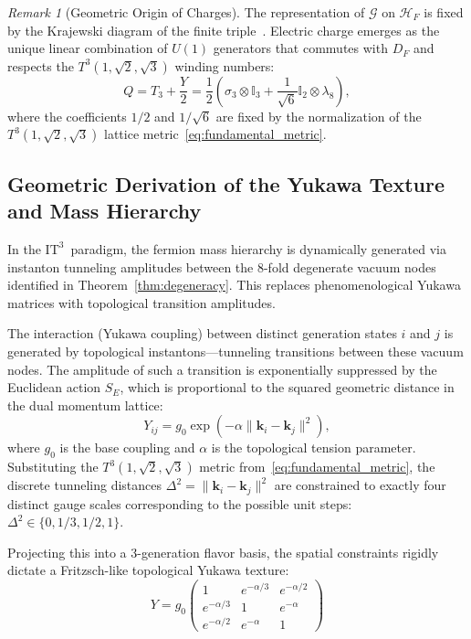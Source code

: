 \documentclass[onecolumn,aps,prd,superscriptaddress,nofootinbib,amsmath,amssymb]{revtex4-2}
\theoremstyle{definition}
\theoremstyle{remark}
\newtheorem{remark}[theorem]{Remark}
\newcommand{\ITthree}{\ensuremath{\mathrm{IT}^3}}
\newcommand{\vect}[1]{\boldsymbol{#1}}
\newcommand{\Tthree}{T^3(1,\sqrt{2},\sqrt{3})}
\begin{document}
\begin{remark}[Geometric Origin of Charges]
The representation of $\mathcal{G}$ on $\mathcal{H}_F$ is fixed by the Krajewski diagram of the finite triple~\cite{chamseddine2007}.
Electric charge emerges as the unique linear combination of $U(1)$ generators that commutes with $D_F$ and respects the $\Tthree$ winding numbers:
\begin{equation}
Q = T_3 + \frac{Y}{2} = \frac{1}{2}\left( \sigma_3 \otimes \mathbb{I}_3 + \frac{1}{\sqrt{6}} \mathbb{I}_2 \otimes \lambda_8 \right),
\end{equation}
where the coefficients $1/2$ and $1/\sqrt{6}$ are fixed by the normalization of the $\Tthree$ lattice metric~\eqref{eq:fundamental_metric}.
\end{remark}

\subsection{Geometric Derivation of the Yukawa Texture and Mass Hierarchy}
\label{subsec:yukawa_texture}

In the \ITthree\ paradigm, the fermion mass hierarchy is dynamically generated via instanton tunneling amplitudes between the 8-fold degenerate vacuum nodes identified in Theorem~\ref{thm:degeneracy}. This replaces phenomenological Yukawa matrices with topological transition amplitudes.

The interaction (Yukawa coupling) between distinct generation states $i$ and $j$ is generated by topological instantons---tunneling transitions between these vacuum nodes. The amplitude of such a transition is exponentially suppressed by the Euclidean action $S_E$, which is proportional to the squared geometric distance in the dual momentum lattice:
\begin{equation}
Y_{ij} = g_0 \exp\left( -\alpha \|\vect{k}_i - \vect{k}_j\|^2 \right),
\label{eq:yukawa_amplitude}
\end{equation}
where $g_0$ is the base coupling and $\alpha$ is the topological tension parameter. Substituting the $\Tthree$ metric from~\eqref{eq:fundamental_metric}, the discrete tunneling distances $\Delta^2 = \|\vect{k}_i - \vect{k}_j\|^2$ are constrained to exactly four distinct gauge scales corresponding to the possible unit steps: $\Delta^2 \in \{0, 1/3, 1/2, 1\}$.

Projecting this into a 3-generation flavor basis, the spatial constraints rigidly dictate a Fritzsch-like topological Yukawa texture:
\begin{equation}
Y = g_0 \begin{pmatrix} 
1 & e^{-\alpha/3} & e^{-\alpha/2} \\ 
e^{-\alpha/3} & 1 & e^{-\alpha} \\ 
e^{-\alpha/2} & e^{-\alpha} & 1 
\end{pmatrix}
\label{eq:yukawa_matrix}
\end{equation}
\end{document}
